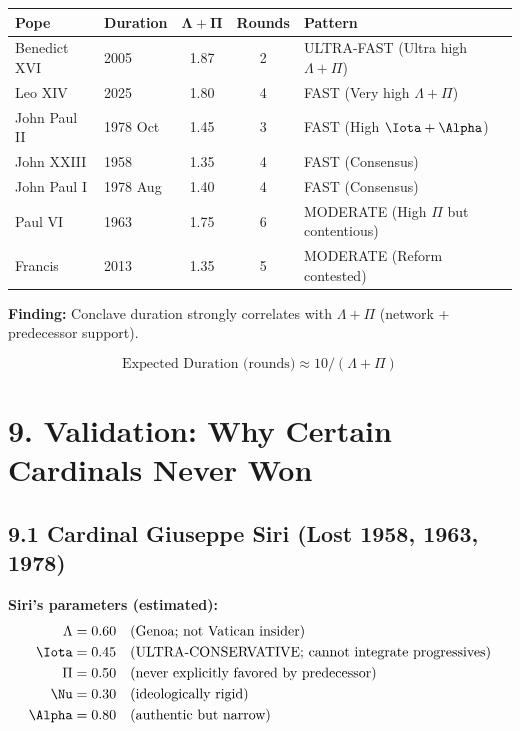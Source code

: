\begin{table}[h]
\centering
\begin{tabular}{|l|l|c|c|l|}
\hline
\textbf{Pope} & \textbf{Duration} & $\mathbf{\Lambda + \Pi}$ & \textbf{Rounds} & \textbf{Pattern} \\
\hline
Benedict XVI & 2005 & 1.87 & 2 & ULTRA-FAST (Ultra high $\Lambda + \Pi$) \\
Leo XIV & 2025 & 1.80 & 4 & FAST (Very high $\Lambda + \Pi$) \\
John Paul II & 1978 Oct & 1.45 & 3 & FAST (High $\Iota + \Alpha$) \\
John XXIII & 1958 & 1.35 & 4 & FAST (Consensus) \\
John Paul I & 1978 Aug & 1.40 & 4 & FAST (Consensus) \\
Paul VI & 1963 & 1.75 & 6 & MODERATE (High $\Pi$ but contentious) \\
Francis & 2013 & 1.35 & 5 & MODERATE (Reform contested) \\
\hline
\end{tabular}
\end{table}

\textbf{Finding:} Conclave duration strongly correlates with $\Lambda + \Pi$ (network + predecessor support).

$$\text{Expected Duration (rounds)} \approx 10 / (\Lambda + \Pi)$$

\section{9. Validation: Why Certain Cardinals Never Won}

\subsection{9.1 Cardinal Giuseppe Siri (Lost 1958, 1963, 1978)}

\textbf{Siri's parameters (estimated):}
\begin{align*}
\Lambda &= 0.60 \quad \text{(Genoa; not Vatican insider)} \\
\Iota &= 0.45 \quad \text{(ULTRA-CONSERVATIVE; cannot integrate progressives)} \\
\Pi &= 0.50 \quad \text{(never explicitly favored by predecessor)} \\
\Nu &= 0.30 \quad \text{(ideologically rigid)} \\
\Alpha &= 0.80 \quad \text{(authentic but narrow)}
\end{align*}

